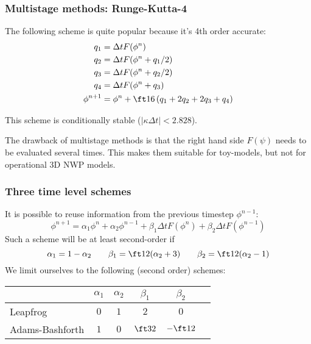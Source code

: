 \documentclass[aspectratio=43,9pt]{beamer}
\begin{document}
%
%
%
\begin{frame}
	\frametitle{Multistage methods: Runge-Kutta-4}
	The following scheme is quite popular because it's 4th order accurate:
	\begin{align*}
		q_1&=\Delta tF(\phi^n)	\\
		q_2&=\Delta tF(\phi^n+q_1/2)	\\
		q_3&=\Delta tF(\phi^n+q_2/2)	\\
		q_4&=\Delta tF(\phi^n+q_3)	\\
		\phi^{n+1}&=\phi^n+\ft16\left(q_1+2q_2+2q_3+q_4\right)
	\end{align*}
	\par
	This scheme is conditionally stable ($|\kappa\Delta t|<2.828$).
	\vspace*{3mm}\par
	The drawback of multistage methods is that the right hand side $F(\psi)$ needs to be evaluated several times. This makes them suitable for toy-models, but not for operational 3D NWP models.
\end{frame}
%
%
%
\begin{frame}
	\frametitle{Three time level schemes}
	It is possible to reuse information from the previous timestep $\phi^{n-1}$:
	\begin{equation*}
		\phi^{n+1} = \alpha_1 \phi^n + \alpha_2 \phi^{n-1} + \beta_1 \Delta t F ( \phi^n ) +\beta_2 \Delta t F ( \phi^{n-1} )
	\end{equation*}
	Such a scheme will be at least second-order if
	\begin{equation*}
		\alpha_1 = 1 - \alpha_2 \qquad  \beta_1 = \ft12 ( \alpha_2 +3 ) \qquad  \beta_2 = \ft12 ( \alpha_2 -1 )
	\end{equation*}
	We limit ourselves to the following (second order) schemes:
	\begin{center}
		\def\arraystretch{1.5}
		\begin{tabular}{lccccl}
				&	$\alpha_1$	&	$\alpha_2$	&	$\beta_1$	&	$\beta_2$	\\
			\hline
				Leapfrog & $0$ & $1$ & $2$ & $0$	\\
				Adams-Bashforth & $1$ & $0$ & $\ft32$ & $-\ft12$
		\end{tabular}
	\end{center}
\end{frame}
%
\end{document}
